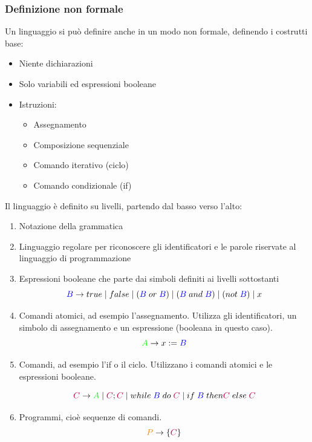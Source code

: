 \documentclass[a4paper]{article}
\begin{document}
\subsubsection{Definizione non formale}
Un linguaggio si può definire anche in un modo non formale, definendo
i costrutti base:
\begin{itemize}
  \item Niente dichiarazioni
  \item Solo variabili ed espressioni booleane
  \item Istruzioni:
    \begin{itemize}
      \item Assegnamento
      \item Composizione sequenziale
      \item Comando iterativo (ciclo)
      \item Comando condizionale (if)
    \end{itemize}
\end{itemize}
Il linguaggio è definito su livelli, partendo dal basso verso l'alto:
\begin{enumerate}
  \item Notazione della grammatica

  \item Linguaggio regolare per riconoscere gli identificatori e le parole
    riservate al linguaggio di programmazione

  \item Espressioni booleane che parte dai simboli definiti ai livelli
    sottostanti
    \[
      \color{blue}B\color{black} \to true \mid false \mid
      (\color{blue}B\color{black} \; or \; \color{blue}B\color{black}) \mid
      (\color{blue}B\color{black} \; and \; \color{blue}B\color{black}) \mid
      (not \; \color{blue}B\color{black}) \mid x
    \] 

  \item Comandi atomici, ad esempio l'assegnamento. Utilizza gli identificatori,
    un simbolo di assegnamento e un espressione (booleana in questo caso).
    \[
      \color{green}A\color{black} \to x := \color{blue}B\color{black}
    \] 

  \item Comandi, ad esempio l'if o il ciclo. Utilizzano i comandi atomici
    e le espressioni booleane.

    \[
      \color{purple}C\color{black} \to \color{green}A\color{black} \mid
      \color{purple}C\color{black} ; \color{purple}C\color{black} \mid
      while \; \color{blue}B\color{black} \; do \; \color{purple}C\color{black} \mid
      if \; \color{blue}B\color{black} \; then \color{purple}C\color{black} \; else
      \; \color{purple}C\color{black}
    \] 

  \item Programmi, cioè sequenze di comandi.
    \[
      \color{orange}P\color{black} \to
      \left\{ \color{purple}C\color{black} \right\}
    \] 
\end{enumerate}
\end{document}
